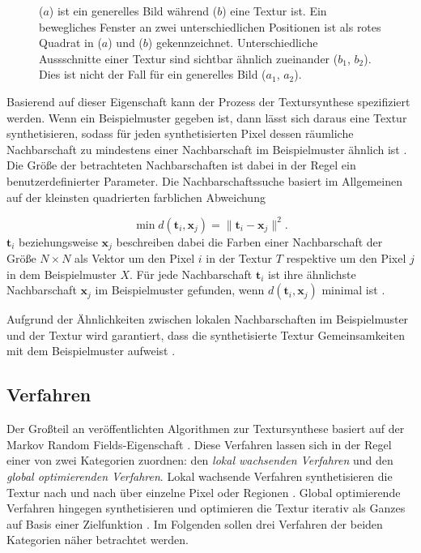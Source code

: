 \begin{figure}
\begin{subfigure}{0.45\textwidth}
	\end{subfigure}
	
	\caption{
		($a$) ist ein generelles Bild während ($b$) eine Textur ist.
		Ein bewegliches Fenster an zwei unterschiedlichen Positionen ist als rotes Quadrat in ($a$) und ($b$) gekennzeichnet.
		Unterschiedliche Aussschnitte einer Textur sind sichtbar ähnlich zueinander ($b_1$, $b_2$).
		Dies ist nicht der Fall für ein generelles Bild ($a_1$, $a_2$).
	}
	\label{mrf}
\end{figure}

Basierend auf dieser Eigenschaft kann der Prozess der Textursynthese spezifiziert werden.
Wenn ein Beispielmuster gegeben ist, dann lässt sich daraus eine Textur synthetisieren, sodass für jeden synthetisierten Pixel dessen räumliche Nachbarschaft zu mindestens einer Nachbarschaft im Beispielmuster ähnlich ist \cite{StateOfTheArt}.
Die Größe der betrachteten Nachbarschaften ist dabei in der Regel ein benutzerdefinierter Parameter.
Die Nachbarschaftssuche basiert im Allgemeinen auf der kleinsten quadrierten farblichen Abweichung 

\begin{equation}
	\label{nachbarschaftssuche}
	\min d(\textbf{t}_i, \textbf{x}_j) = \lVert \textbf{t}_i - \textbf{x}_j \rVert^2\text{.}
\end{equation}
$\textbf{t}_i$ beziehungsweise $\textbf{x}_j$ beschreiben dabei die Farben einer Nachbarschaft der Größe $N \times N$ als Vektor um den Pixel $i$ in der Textur $T$ respektive um den Pixel $j$ in dem Beispielmuster $X$.
Für jede Nachbarschaft $\textbf{t}_i$ ist ihre ähnlichste Nachbarschaft $\textbf{x}_j$ im Beispielmuster gefunden, wenn $d(\textbf{t}_i, \textbf{x}_j)$ minimal ist \cite{TextureOptimization}.

Aufgrund der Ähnlichkeiten zwischen lokalen Nachbarschaften im Beispielmuster und der Textur wird garantiert, dass die synthetisierte Textur Gemeinsamkeiten mit dem Beispielmuster aufweist \cite{StateOfTheArt}.

\subsection{Verfahren}

Der Großteil an veröffentlichten Algorithmen zur Textursynthese basiert auf der \glqq Markov Random Fields\grqq -Eigenschaft \cite{StateOfTheArt}.
Diese Verfahren lassen sich in der Regel einer von zwei Kategorien zuordnen: den \emph{lokal wachsenden Verfahren} und den \emph{global optimierenden Verfahren}.
Lokal wachsende Verfahren synthetisieren die Textur nach und nach über einzelne Pixel oder Regionen \cite{TextureOptimization}.
Global optimierende Verfahren hingegen synthetisieren und optimieren die Textur iterativ als Ganzes auf Basis einer Zielfunktion \cite{SelfTuning}.
Im Folgenden sollen drei Verfahren der beiden Kategorien näher betrachtet werden.

